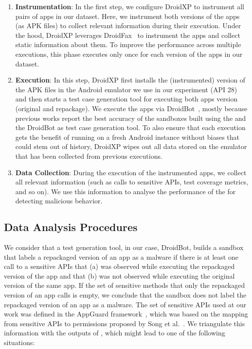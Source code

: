 \begin{enumerate}[S1]
 \item \textbf{Instrumentation}: In the first step,
we configure DroidXP to instrument all pairs of apps in our dataset.
Here, we instrument both versions of the apps (as APK files) to collect relevant information during their execution. Under the hood, DroidXP leverages
DroidFax~\cite{DBLP:conf/icsm/CaiR17a} to instrument the apps and collect static
information about them. To improve the performance across multiple executions,
this phase executes only once for each version of the apps in our dataset.

\item \textbf{Execution}: In this step, DroidXP first installs the (instrumented) version of the APK files in the Android emulator we use in our experiment (API 28) and then starts a test case generation tool for executing both apps version (original and repackage). We execute the apps via DroidBot~\cite{DBLP:conf/icse/LiYGC17}, mostly because previous works report the best accuracy of the sandboxes built using the \mas and the DroidBot as test case generation tool. To also ensure that each execution gets the benefit of running on a fresh Android instance without biases that could stem out of history, DroidXP wipes out all data stored on the emulator that has been collected from previous executions.


\item \textbf{Data Collection}: During the execution of the instrumented apps, we collect all relevant information (such as calls to sensitive APIs, test coverage metrics, and so on). We use this information to analyse the performance of the \mas for detecting malicious behavior.
\end{enumerate}

\subsection{Data Analysis Procedures} \label{sec:dataAnalysisProc}



We consider that a test
generation tool, in our case, DroidBot, builds a sandbox that labels a repackaged version
of an app as a malware if there is at least one call to a sensitive APIs that (a) was observed
while executing the repackaged version of the app and that (b) was not observed while
executing the original version of the same app. If the set of sensitive methods that only the repackaged version of an app calls is empty,
we conclude that the sandbox does not label the repackaged version of an app as a malware. The set of sensitive APIs used at our work was defined in the AppGuard framework~\cite{DBLP:conf/esorics/BackesGHMS13}, which was based on the mapping from sensitive APIs to permissions proposed by Song et al.~\cite{DBLP:conf/ccs/FeltCHSW11}. We triangulate
this information with the outputs of \vt, which might lead to one of the following
situations:

